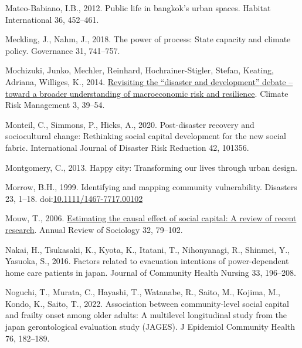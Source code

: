 \documentclass[]{elsarticle} %
\newlength{\cslhangindent}
\newlength{\cslentryspacingunit} %
\newenvironment{CSLReferences}[2] %
 {%
  \setlength{\parindent}{0pt}
  \ifodd #1
  \let\oldpar\par
  \def\par{\hangindent=\cslhangindent\oldpar}
  \fi
  \setlength{\parskip}{#2\cslentryspacingunit}
 }%
 {}
\begin{document}
\begin{CSLReferences}{1}{0}
\leavevmode{}%
Mateo-Babiano, I.B., 2012. Public life in bangkok's urban spaces.
Habitat International 36, 452--461.

\leavevmode{}%
Meckling, J., Nahm, J., 2018. The power of process: State capacity and
climate policy. Governance 31, 741--757.

\leavevmode{}%
Mochizuki, Junko, Mechler, Reinhard, Hochrainer-Stigler, Stefan,
Keating, Adriana, Williges, K., 2014.
\href{https://doi.org/10.1016/j.crm.2014.05.002}{Revisiting the
{``disaster and development''} debate -- toward a broader understanding
of macroeconomic risk and resilience}. Climate Risk Management 3,
39--54.

\leavevmode{}%
Monteil, C., Simmons, P., Hicks, A., 2020. Post-disaster recovery and
sociocultural change: Rethinking social capital development for the new
social fabric. International Journal of Disaster Risk Reduction 42,
101356.

\leavevmode{}%
Montgomery, C., 2013. Happy city: Transforming our lives through urban
design.

\leavevmode{}%
Morrow, B.H., 1999. Identifying and mapping community vulnerability.
Disasters 23, 1--18.
doi:\href{https://doi.org/10.1111/1467-7717.00102}{10.1111/1467-7717.00102}

\leavevmode{}%
Mouw, T., 2006. \href{http://www.jstor.org/stable/29737732}{Estimating
the causal effect of social capital: A review of recent research}.
Annual Review of Sociology 32, 79--102.

\leavevmode{}%
Nakai, H., Tsukasaki, K., Kyota, K., Itatani, T., Nihonyanagi, R.,
Shinmei, Y., Yasuoka, S., 2016. Factors related to evacuation intentions
of power-dependent home care patients in japan. Journal of Community
Health Nursing 33, 196--208.

\leavevmode{}%
Noguchi, T., Murata, C., Hayashi, T., Watanabe, R., Saito, M., Kojima,
M., Kondo, K., Saito, T., 2022. Association between community-level
social capital and frailty onset among older adults: A multilevel
longitudinal study from the japan gerontological evaluation study
(JAGES). J Epidemiol Community Health 76, 182--189.


\end{CSLReferences}
\end{document}
